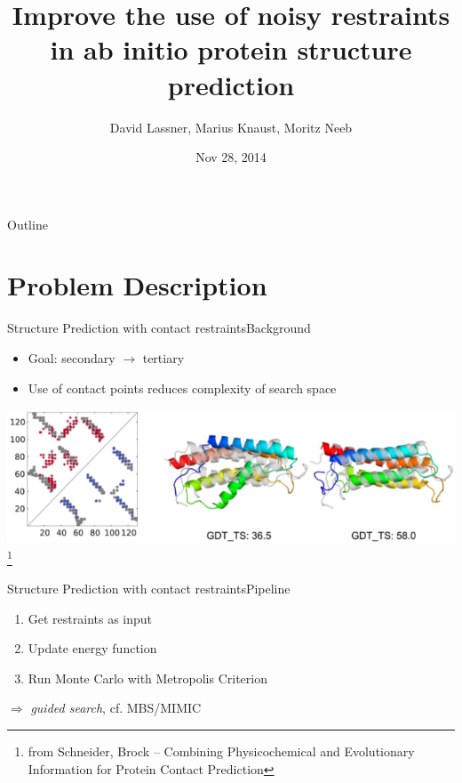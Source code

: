 \documentclass{beamer}
\title[Restraint Selection in PSP] %
{Improve the use of noisy restraints in ab initio protein structure prediction}
\author%
{David Lassner, Marius Knaust, Moritz Neeb}
\institute[Universities of Somewhere and Elsewhere] %
{
  Computational Biology Project\\
  TU Berlin}
\date%
{Nov 28, 2014}
\begin{document}
\begin{frame}
  \titlepage
\end{frame}

\begin{frame}{Outline}
  \tableofcontents
\end{frame}




\section{Problem Description}

\begin{frame}{Structure Prediction with contact restraints}{Background}

\begin{itemize}
    \item Goal: secondary $\rightarrow$ tertiary
    \item Use of contact points reduces complexity of search space
\end{itemize}
\includegraphics[width=\textwidth]{contact_prediction}\footnote{from Schneider, Brock -- 
Combining Physicochemical and Evolutionary
Information for Protein Contact Prediction}
\end{frame}

\begin{frame}{Structure Prediction with contact restraints}{Pipeline}
\begin{enumerate}
    \item Get restraints as input
    \item Update energy function
    \item Run Monte Carlo with Metropolis Criterion
\end{enumerate}
$\Rightarrow$ \emph{guided search}, cf. MBS/MIMIC
\end{frame}
\end{document}
